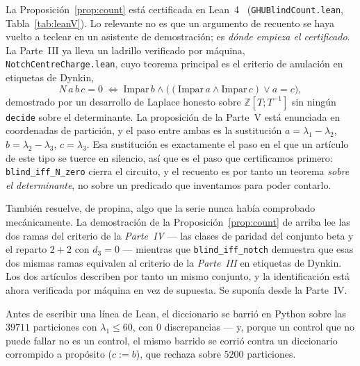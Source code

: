 \documentclass[11pt,a4paper]{article}
\begin{document}
La Proposición~\ref{prop:count} está certificada en Lean~4~\cite{Lean4}
(\texttt{GHUBlindCount.lean}, Tabla~\ref{tab:leanV}). Lo relevante no es que un argumento de recuento
se haya vuelto a teclear en un asistente de demostración; es \emph{dónde empieza el certificado}. La
Parte~III ya lleva un ladrillo verificado por máquina, \texttt{NotchCentreCharge.lean}, cuyo teorema
principal es el criterio de anulación en etiquetas de Dynkin,
\[
N\,a\,b\,c=0\;\Longleftrightarrow\;\mathrm{Impar}\,b\wedge\big((\mathrm{Impar}\,a\wedge\mathrm{Impar}\,c)\vee a=c\big),
\]
demostrado por un desarrollo de Laplace honesto sobre $\mathbb{Z}[T;T^{-1}]$ sin ningún
\texttt{decide} sobre el determinante. La proposición de la Parte~V está enunciada en coordenadas de
partición, y el paso entre ambas es la sustitución $a=\lambda_1-\lambda_2$, $b=\lambda_2-\lambda_3$,
$c=\lambda_3$. Esa sustitución es exactamente el paso en el que un artículo de este tipo se tuerce en
silencio, así que es el paso que certificamos primero: \texttt{blind\_iff\_N\_zero} cierra el
circuito, y el recuento es por tanto un teorema \emph{sobre el determinante}, no sobre un predicado
que inventamos para poder contarlo.

También resuelve, de propina, algo que la serie nunca había comprobado mecánicamente. La
demostración de la Proposición~\ref{prop:count} de arriba lee las dos ramas del criterio de la
\emph{Parte~IV} --- las clases de paridad del conjunto beta y el reparto $2{+}2$ con $d_3=0$ ---
mientras que \texttt{blind\_iff\_notch} demuestra que esas dos mismas ramas equivalen al criterio de
la \emph{Parte~III} en etiquetas de Dynkin. Los dos artículos describen por tanto un mismo conjunto,
y la identificación está ahora verificada por máquina en vez de supuesta. Se suponía desde la
Parte~IV.

Antes de escribir una línea de Lean, el diccionario se barrió en Python sobre las $39711$ particiones
con $\lambda_1\le 60$, con $0$ discrepancias --- y, porque un control que no puede fallar no es un
control, el mismo barrido se corrió contra un diccionario corrompido a propósito ($c:=b$), que
rechaza sobre $5200$ particiones.
\end{document}
